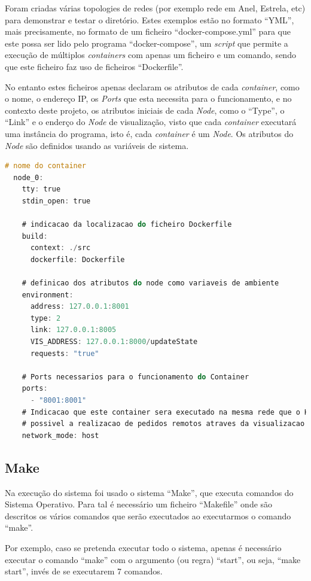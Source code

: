 Foram criadas várias topologies de redes (por exemplo rede em Anel, Estrela, etc) para demonstrar e testar o diretório.
Estes exemplos estão no formato ``YML'', mais precisamente, no formato de um ficheiro ``docker-compose.yml'' para que este possa ser lido pelo programa ``docker-compose'', um \emph{script} que permite a execução de múltiplos \emph{containers} com apenas um ficheiro e um comando, sendo que este ficheiro faz uso de ficheiros ``Dockerfile''.

No entanto estes ficheiros apenas declaram os atributos de cada \emph{container}, como o nome, o endereço \acs{IP}, os \emph{Ports} que esta necessita para o funcionamento, e no contexto deste projeto, os atributos iniciais de cada \emph{Node}, como o ``Type'', o 
``Link'' e o enderço do \emph{Node} de visualização, visto que cada \emph{container} executará uma instância do programa, isto é, cada \emph{container} é um \emph{Node}. Os atributos do \emph{Node} são definidos usando as variáveis de sistema.


\begin{lstlisting}[caption={Ficheiro docker-compose.yml},language=C]
  # nome do container
  node_0:
    tty: true
    stdin_open: true

    # indicacao da localizacao do ficheiro Dockerfile
    build:
      context: ./src
      dockerfile: Dockerfile

    # definicao dos atributos do node como variaveis de ambiente
    environment:
      address: 127.0.0.1:8001
      type: 2 
      link: 127.0.0.1:8005
      VIS_ADDRESS: 127.0.0.1:8000/updateState
      requests: "true"

    # Ports necessarios para o funcionamento do Container
    ports:
      - "8001:8001"
    # Indicacao que este container sera executado na mesma rede que o Host, isto para que seja
    # possivel a realizacao de pedidos remotos atraves da visualizacao
    network_mode: host
\end{lstlisting}


\subsection*{Make}

Na execução do sistema foi usado o sistema ``Make'', que executa comandos do Sistema Operativo. Para tal é necessário um ficheiro ``Makefile'' onde são descritos os vários comandos que serão executados ao executarmos o comando ``make''.

Por exemplo, caso se pretenda executar todo o sistema, apenas é necessário executar o comando ``make'' com o argumento (ou regra) ``start'', ou seja, ``make start'', invés de se executarem 7 comandos.


